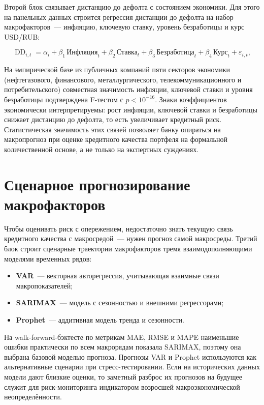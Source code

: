 \documentclass[a4paper,12pt]{article}
\DeclareMathOperator{\DD}{DD}
\begin{document}
Второй блок связывает дистанцию до дефолта с состоянием экономики. Для этого на панельных данных
строится регрессия дистанции до дефолта на набор макрофакторов~--- инфляцию, ключевую ставку,
уровень безработицы и курс USD/RUB:

\[
    \DD_{i,t} = \alpha_i + \beta_1 \, \text{Инфляция}_t + \beta_2 \, \text{Ставка}_t
              + \beta_3 \, \text{Безработица}_t + \beta_4 \, \text{Курс}_t + \varepsilon_{i,t},
\]

На эмпирической базе из публичных компаний пяти секторов экономики (нефтегазового, финансового,
металлургического, телекоммуникационного и потребительского) совместная значимость инфляции,
ключевой ставки и уровня безработицы подтверждена F-тестом с $p < 10^{-16}$. Знаки коэффициентов
экономически интерпретируемы: рост инфляции, ключевой ставки и безработицы снижает дистанцию до
дефолта, то есть увеличивает кредитный риск. Статистическая значимость этих связей позволяет
банку опираться на макропрогноз при оценке кредитного качества портфеля на формальной
количественной основе, а не только на экспертных суждениях.

\section{Сценарное прогнозирование макрофакторов}

Чтобы оценивать риск с опережением, недостаточно знать текущую связь
кредитного качества с макросредой~--- нужен прогноз самой макросреды. Третий блок строит сценарные
траектории макрофакторов тремя взаимодополняющими моделями временных рядов:

\begin{itemize}[leftmargin=2em, itemsep=2pt]
    \item \textbf{VAR}~--- векторная авторегрессия, учитывающая взаимные связи макропоказателей;
    \item \textbf{SARIMAX}~--- модель с сезонностью и внешними регрессорами;
    \item \textbf{Prophet}~--- аддитивная модель тренда и сезонности.
\end{itemize}

На walk-forward-бэктесте по метрикам MAE, RMSE и MAPE наименьшие ошибки практически по всем
макрорядам показала SARIMAX, поэтому она выбрана базовой моделью прогноза. Прогнозы VAR и Prophet
используются как альтернативные сценарии при стресс-тестировании. Если на исторических данных
модели дают близкие оценки, то заметный разброс их прогнозов на будущее служит для
риск-мониторинга индикатором возросшей макроэкономической неопределённости.
\end{document}
